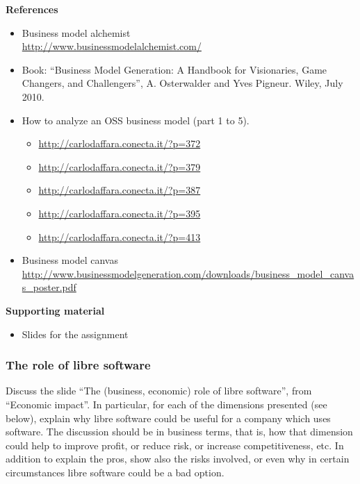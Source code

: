 \documentclass[a4paper]{article}
\begin{document}
\textbf{References}

\begin{itemize}
\item Business model alchemist \\
  \url{http://www.businessmodelalchemist.com/} 
\item Book: ``Business Model Generation: A Handbook for Visionaries, Game Changers, and Challengers'', A. Osterwalder and Yves Pigneur. Wiley, July 2010.
\item How to analyze an OSS business model (part 1 to 5).
  \begin{itemize}
  \item \url{http://carlodaffara.conecta.it/?p=372}
  \item \url{http://carlodaffara.conecta.it/?p=379}
  \item \url{http://carlodaffara.conecta.it/?p=387}
  \item \url{http://carlodaffara.conecta.it/?p=395}
  \item \url{http://carlodaffara.conecta.it/?p=413}
  \end{itemize}
\item Business model canvas \\
  \url{http://www.businessmodelgeneration.com/downloads/business_model_canvas_poster.pdf}
\end{itemize}

\textbf{Supporting material}

\begin{itemize}
\item Slides for the assignment
\end{itemize}


\subsubsection{The role of libre software}
\label{sub:impact-role}

Discuss the slide ``The (business, economic) role of libre software'', from ``Economic impact''. In particular, for each of the dimensions presented (see below), explain why libre software could be useful for a company which uses software. The discussion should be in business terms, that is, how that dimension could help to improve profit, or reduce risk, or increase competitiveness, etc. In addition to explain the pros, show also the risks involved, or even why in certain circumstances libre software could be a bad option.
\end{document}
